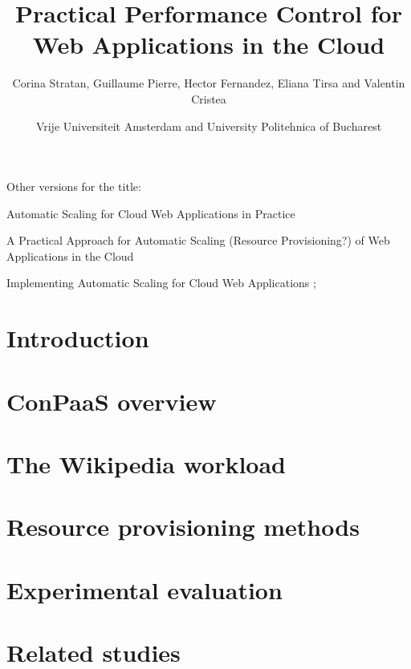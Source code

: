 \documentclass[10pt,twocolumn]{article}
\begin{document}
\begin{multicols}{2}
\title{Practical Performance Control for Web Applications in the Cloud}
\author{Corina Stratan, Guillaume Pierre, Hector Fernandez, Eliana Tirsa and Valentin Cristea} 
\date{Vrije Universiteit Amsterdam and University Politehnica of Bucharest}
\maketitle
\end{multicols}


Other versions for the title:

Automatic Scaling for Cloud Web Applications in Practice

A Practical Approach for Automatic Scaling (Resource Provisioning?) of
Web Applications in the Cloud

Implementing Automatic Scaling for Cloud Web Applications
;

\section{Introduction}



\section{ConPaaS overview}



\section{The Wikipedia workload \label{wikipedia}}



\section{Resource provisioning methods}



\section{Experimental evaluation \label{experiments}}



\section{Related studies}
\end{document}
